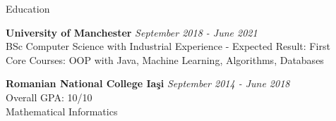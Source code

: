 \documentclass{resume} %
\begin{document}

\begin{rSection}{Education}

{\bf University of Manchester} \hfill {\em September 2018 - June 2021} 
\\ BSc Computer Science with Industrial Experience - Expected Result: First
\\ Core Courses: OOP with Java, Machine Learning, Algorithms, Databases

{\bf Romanian National College Ia\c{s}i} \hfill {\em September 2014 - June 2018} 
\\ { Overall GPA: 10/10}
\\ Mathematical Informatics

 

\end{rSection}

\end{document}
